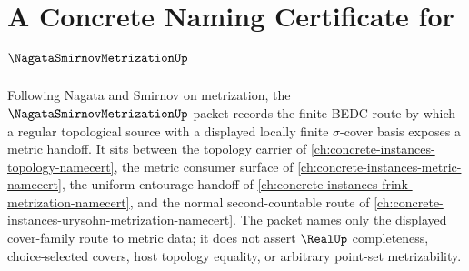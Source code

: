 \chapter{A Concrete Naming Certificate for $\NagataSmirnovMetrizationUp$}
\label{ch:concrete-instances-nagata-smirnov-metrization-namecert}

Following Nagata and Smirnov on metrization, the $\NagataSmirnovMetrizationUp$ packet records the finite BEDC route by which a regular topological source with a displayed locally finite $\sigma$-cover basis exposes a metric handoff. It sits between the topology carrier of \autoref{ch:concrete-instances-topology-namecert}, the metric consumer surface of \autoref{ch:concrete-instances-metric-namecert}, the uniform-entourage handoff of \autoref{ch:concrete-instances-frink-metrization-namecert}, and the normal second-countable route of \autoref{ch:concrete-instances-urysohn-metrization-namecert}. The packet names only the displayed cover-family route to metric data; it does not assert $\RealUp$ completeness, choice-selected covers, host topology equality, or arbitrary point-set metrizability.

